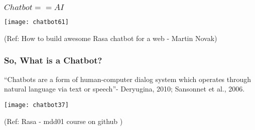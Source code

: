 




\begin{frame}[fragile]\frametitle{$Chatbot == AI$}


\begin{center}
\texttt{[image: chatbot61]}
\end{center}

{\tiny (Ref: How to build awesome Rasa chatbot for a web - Martin Novak)}


\end{frame}











\begin{frame}[fragile]\frametitle{So, What is a Chatbot?}

``Chatbots are a form of human-computer dialog system which operates 
through natural language via text or speech''- Deryugina, 2010; Sansonnet et al., 2006.

\begin{center}
\texttt{[image: chatbot37]}

{\tiny (Ref: Rasa - mdd01 course on github )}

\end{center}

\end{frame}


